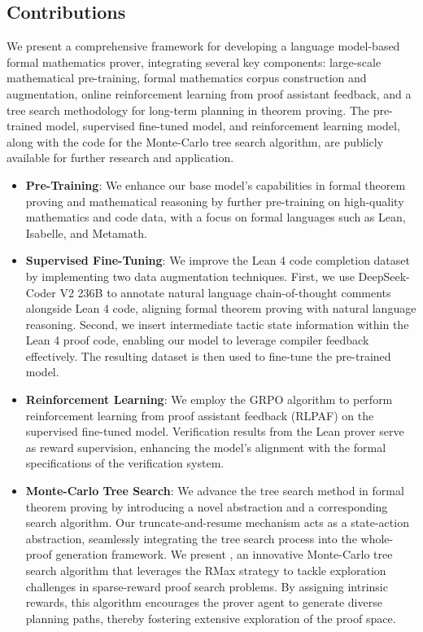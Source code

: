 \subsection{Contributions}

We present a comprehensive framework for developing a language model-based formal mathematics prover, integrating several key components: large-scale mathematical pre-training, formal mathematics corpus construction and augmentation, online reinforcement learning from proof assistant feedback, and a tree search methodology for long-term planning in theorem proving. The pre-trained model, supervised fine-tuned model, and reinforcement learning model, along with the code for the Monte-Carlo tree search algorithm, are publicly available for further research and application.

\begin{itemize}
\item \textbf{Pre-Training}: We enhance our base model's capabilities in formal theorem proving and mathematical reasoning by further pre-training on high-quality mathematics and code data, with a focus on formal languages such as Lean, Isabelle, and Metamath.
\item \textbf{Supervised Fine-Tuning}: We improve the Lean 4 code completion dataset by implementing two data augmentation techniques. First, we use DeepSeek-Coder V2 236B \citep{zhu2024deepseek} to annotate natural language chain-of-thought comments alongside Lean 4 code, aligning formal theorem proving with natural language reasoning. Second, we insert intermediate tactic state information within the Lean 4 proof code, enabling our model to leverage compiler feedback effectively. The resulting dataset is then used to fine-tune the pre-trained model.
\item \textbf{Reinforcement Learning}: We employ the GRPO algorithm \citep{shao2024deepseekmath} to perform reinforcement learning from proof assistant feedback (RLPAF) on the supervised fine-tuned model. Verification results from the Lean prover serve as reward supervision, enhancing the model's alignment with the formal specifications of the verification system.
\item \textbf{Monte-Carlo Tree Search}: We advance the tree search method in formal theorem proving by introducing a novel abstraction and a corresponding search algorithm. Our truncate-and-resume mechanism acts as a state-action abstraction, seamlessly integrating the tree search process into the whole-proof generation framework. We present \treesearch, an innovative Monte-Carlo tree search algorithm that leverages the RMax \citep{brafman2002r} strategy to tackle exploration challenges in sparse-reward proof search problems. By assigning intrinsic rewards, this algorithm encourages the prover agent to generate diverse planning paths, thereby fostering extensive exploration of the proof space.
\end{itemize}

